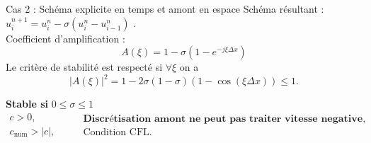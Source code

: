 \documentclass[aspectratio=169, french]{beamer}
\begin{document}
\begin{frame}{Cas 2 : Schéma explicite en temps et amont en espace}
	Schéma résultant : 
	$u_{i}^{n+1} = u_{i}^n - \sigma(u_{i}^n - u_{i-1}^n)$ . \\
	\vspace{.5cm}
	Coefficient d'amplification :
	\begin{equation*}
		A(\xi) = 1 - \sigma(1- e^{-j  \xi \Delta x})
	\end{equation*}
	Le critère de stabilité est respecté si $\forall \xi$ on a
	\begin{equation*}
		|A(\xi)|^2 = 1 - 2 \sigma(1-\sigma)(1 - \cos(\xi \Delta x))\le 1.
	\end{equation*}
	
	\begin{tcolorbox}[title=Conditions de stabilité, coltitle=white]
	\textbf{Stable si }   $0 \le \sigma \le 1$
	\begin{equation*}
		\begin{aligned}
			c>0, \\
			c_{\mathrm{num}}>|c|, 
		\end{aligned}
		\qquad 
		\begin{aligned}
			\textbf{Discrétisation amont ne peut pas traiter vitesse negative}, \\
			\text{Condition CFL.}
		\end{aligned}
	\end{equation*}
		
	\end{tcolorbox}
	
\end{frame}
\end{document}
